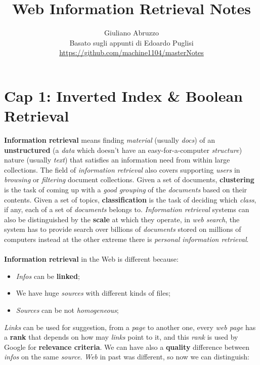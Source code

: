 \documentclass{article}
\author{Giuliano Abruzzo \\
Basato sugli appunti di Edoardo Puglisi \\ \url{https://github.com/machine1104/masterNotes}}
\title{Web Information Retrieval Notes}
\begin{document}
\maketitle
\newpage
\tableofcontents
\newpage
\section{Cap 1: Inverted Index \& Boolean Retrieval}
\textbf{Information retrieval} means finding \emph{material} (usually \emph{docs}) of an \textbf{unstructured} (a \emph{data} which doesn't have an easy-for-a-computer \emph{structure}) nature (usually \emph{text}) that satisfies an information need from within large collections. The field of \emph{information retrieval} also covers supporting \emph{users} in \emph{browsing} or \emph{filtering} document collections. Given a set of documents, \textbf{clustering} is the task of coming up with a \emph{good grouping} of the \emph{documents} based on their contents. Given a set of topics, \textbf{classification} is the task of deciding which \emph{class}, if any, each of a set of \emph{documents} belongs to. \emph{Information retrieval} systems can also be distinguished by the \textbf{scale} at which they operate, in \emph{web search}, the system has to provide search over billions of \emph{documents} stored on millions of computers instead at the other extreme there is \emph{personal information retrieval}. \\\\
\textbf{Information retrieval} in the Web is different because:
\begin{itemize}
\item \emph{Infos} can be \textbf{linked};
\item We have huge \emph{sources} with different kinds of files;
\item \emph{Sources} can be not \emph{homogeneous};
\end{itemize}
\emph{Links} can be used for suggestion, from a \emph{page} to another one, every \emph{web page} has a \textbf{rank} that depends on how may \emph{links} point to it, and this \emph{rank} is used by Google for \textbf{relevance criteria}. We can have also a \textbf{quality} difference between \emph{infos} on the same \emph{source}. \emph{Web} in past was different, so now we can distinguish:
\end{document}
